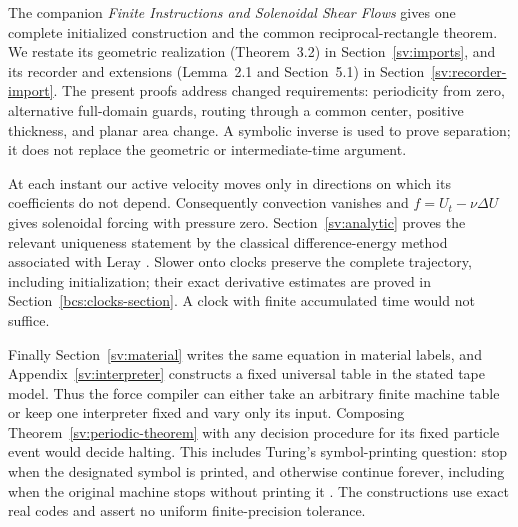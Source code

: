 The companion \emph{Finite Instructions and Solenoidal Shear Flows}
\cite{Entry} gives one complete initialized construction and the common
reciprocal-rectangle theorem.  We restate its geometric realization
(Theorem~3.2) in Section~\ref{sv:imports}, and its recorder and
extensions (Lemma~2.1 and Section~5.1) in
Section~\ref{sv:recorder-import}.  The present proofs address changed requirements:
periodicity from zero, alternative full-domain guards, routing through a
common center, positive thickness, and planar area change.  A symbolic
inverse is used to prove separation; it does not replace the geometric
or intermediate-time argument.

At each instant our active velocity moves only in directions on which its
coefficients do not depend.  Consequently convection vanishes and
$f=U_t-\nu\Delta U$ gives solenoidal forcing with pressure zero.
Section~\ref{sv:analytic} proves the relevant uniqueness statement by the
classical difference-energy method associated with Leray
\cite[Section~18]{Leray1934}.  Slower onto clocks preserve the complete
trajectory, including initialization; their exact derivative estimates
are proved in Section~\ref{bcs:clocks-section}.  A clock with finite
accumulated time would not suffice.

Finally Section~\ref{sv:material} writes the same equation in material
labels, and Appendix~\ref{sv:interpreter} constructs a fixed universal
table in the stated tape model.  Thus the force compiler can either take
an arbitrary finite machine table or keep one interpreter fixed and vary
only its input.  Composing Theorem~\ref{sv:periodic-theorem} with any
decision procedure for its fixed particle event would decide halting.
This includes Turing's symbol-printing question: stop when the designated
symbol is printed, and otherwise continue forever, including when the
original machine stops without printing it \cite[Section~8]{Turing1936}.
The constructions use exact real codes and assert no uniform
finite-precision tolerance.
